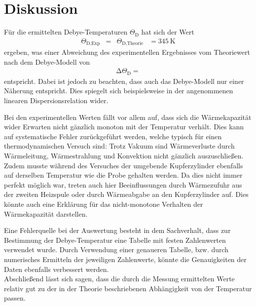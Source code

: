 \section{Diskussion}
\label{sec:Diskussion}

Für die ermittelten Debye-Temperaturen $\Theta_\text{D}$ hat sich der Wert
\begin{align*}
  \Theta_{\text{D,Exp}} &=  & \Theta_{\text{D,Theorie}} &= \SI{345}{\kelvin}
\end{align*}
ergeben, was einer Abweichung des experimentellen Ergebnisses vom Theoriewert \cite{fuck} nach dem Debye-Modell von
\begin{align*}
  \increment \Theta_\text{D} = 
\end{align*}
entspricht.
Dabei ist jedoch zu beachten, dass auch das Debye-Modell nur einer Näherung entspricht.
Dies spiegelt sich beispielsweise in der angenommenen linearen Dispersionsrelation wider.

Bei den experimentellen Werten fällt vor allem auf, dass sich die Wärmekapazität wider Erwarten nicht gänzlich monoton mit der Temperatur verhält.
Dies kann auf systematische Fehler zurückgeführt werden, welche typisch für einen thermodynamischen Versuch sind:
Trotz Vakuum sind Wärmeverluste durch Wärmeleitung, Wärmestrahlung und Konvektion nicht gänzlich auszuschließen.
Zudem musste während des Versuches der umgebende Kupferzylinder ebenfalls auf derselben Temperatur wie die Probe gehalten werden.
Da dies nicht immer perfekt möglich war, treten auch hier Beeinflussungen durch Wärmezufuhr aus der zweiten Heizspule oder durch Wärmeabgabe an den Kupferzylinder auf.
Dies könnte auch eine Erklärung für das nicht-monotone Verhalten der Wärmekapazität darstellen.

Eine Fehlerquelle bei der Auswertung besteht in dem Sachverhalt, dass zur Bestimmung der Debye-Temperatur eine Tabelle mit festen Zahlenwerten verwendet wurde.
Durch Verwendung einer genaueren Tabelle, bzw. durch numerisches Ermitteln der jeweiligen Zahlenwerte, könnte die Genauigkeiten der Daten ebenfalls verbessert werden.\\
Abschließend lässt sich sagen, dass die durch die Messung ermittelten Werte relativ gut zu der in der Theorie beschriebenen Abhängigkeit von der Temperatur passen.
